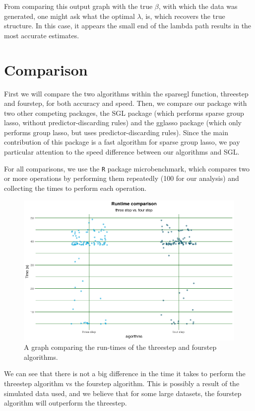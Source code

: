 \documentclass[12pt]{article}
\newcommand{\pkg}[1]{{\normalfont\fontseries{b}\selectfont #1}}
\begin{document}
From comparing this output graph with the true $\beta$, with which the data was generated, one might ask what the optimal $\lambda$, is, which recovers the true structure. In this case, it appears the small end of the lambda path results in the most accurate estimates.


\section{Comparison}

First we will compare the two algorithms within the sparsegl function, threestep and fourstep, for both accuracy and speed. Then, we compare our package with two other competing packages, the \pkg{SGL} package (which performs sparse group lasso, without predictor-discarding rules) and the \pkg{gglasso} package (which only performs group lasso, but uses predictor-discarding rules). Since the main contribution of this package is a fast algorithm for sparse group lasso, we pay particular attention to the speed difference between our algorithms and SGL.

For all comparisons, we use the \texttt{R} package \pkg{microbenchmark}, which compares two or more operations by performing them repeatedly (100 for our analysis) and collecting the times to perform each operation.

\begin{figure}[tb!]
\centering
\includegraphics[scale=0.5]{compare_threefour.png}
\caption{A graph comparing the run-times of the threestep and fourstep algorithms.}
\label{fig:threevsfour}
\end{figure}


We can see that there is not a big difference in the time it takes to perform the threestep algorithm vs the fourstep algorithm. This is possibly a result of the simulated data used, and we believe that for some large datasets, the fourstep algorithm will outperform the threestep.
\end{document}
